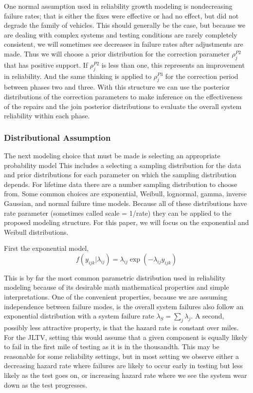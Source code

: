 \documentclass[12pt]{article}
\begin{document}
One normal assumption used in reliability growth modeling is nondecreasing
failure rates; that is either the fixes were effective or had no effect, but did
not degrade the family of vehicles.  This should generally be the case, but
because we are dealing with complex systems and testing conditions are rarely
completely consistent, we will sometimes see decreases in failure rates after
adjustments are made.  Thus we will choose a prior distribution for the
correction parameter $\rho_{j}^{P2}$ that has positive support.  If
$\rho_{j}^{P2}$ is less than one, this represents an improvement in reliability.
And the same thinking is applied to $\rho_{j}^{P3}$ for the correction period
between phases two and three.  With this structure we can use the posterior
distributions of the correction parameters to make inference on the effectiveness
of the repairs and the join posterior distributions to evaluate the overall
system reliability within each phase.

\subsubsection{Distributional Assumption}
The next modeling choice that must be made is selecting an appropriate
probability model This includes a selecting a sampling distribution for the data
and prior distributions for each parameter on which the sampling distribution
depends.  For lifetime data there are a number sampling distribution to choose
from.  Some common choices are exponential, Weibull, lognormal, gamma, inverse
Gaussian, and normal failure time models.  Because all of these distributions
have rate parameter (sometimes called scale = 1/rate) they can be applied to
the proposed modeling structure.  For this paper, we will focus on the
exponential and Weibull distributions.

First the exponential model,
\begin{equation*}
    f(y_{ijk}|\lambda_{ij})=\lambda_{ij} \exp(-\lambda_{ij}y_{ijk})
\end{equation*}

This is by far the most common parametric distribution used in reliability
modeling because of its desirable math mathematical properties and simple
interpretations.  One of the convenient properties, because we are assuming
independence between failure modes, is the overall system failures also follow
an exponential distribution with a system failure rate $\lambda_S =
\sum_{j}\lambda_{j}$.  A second, possibly less attractive property, is that the
hazard rate is constant over miles.  For the JLTV, setting this would assume that a given
component is equally likely to fail in the first mile of testing as it is in the
thousandth.  This may be reasonable for some reliability settings, but in most
setting we observe either a decreasing hazard rate where failures are likely to
occur early in testing but less likely as the test goes on, or increasing hazard
rate where we see the system wear down as the test progresses.
\end{document}

